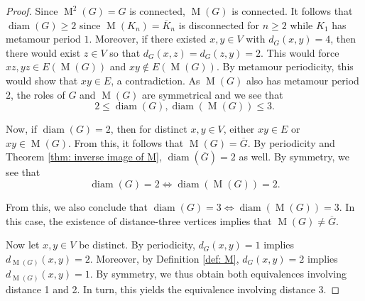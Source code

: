 \documentclass[12pt]{amsart}
\theoremstyle{definition}
\theoremstyle{remark}
\numberwithin{equation}{section}
\numberwithin{figure}{section}
\newcommand{\M}{\operatorname{M}}
\newcommand{\diam}{\operatorname{diam}}
\begin{document}
\begin{proof}
    Since $\M^2(G) = G$ is connected, $\M(G)$ is connected. It follows that $\diam(G) \geq 2$ since $\M(K_n)=\overline{K}_n$ is disconnected for $n\ge 2$ while $K_1$ has metamour period $1$.
    Moreover, if there existed $x,y\in V$ with $d_G(x,y)=4$, then there would exist $z\in V$ so that $d_G(x,z)=d_G(z,y)=2$. This would force $xz,yz\in E(\M(G))$ and $xy\not\in E(\M(G))$. By metamour periodicity, this would show that $xy\in E$, a contradiction. As $\M(G)$ also has metamour period $2$, the roles of $G$ and $\M(G)$ are symmetrical and we see that
    \[ 2 \leq \diam(G), \diam(\M(G)) \leq 3.\]

    Now, if $\diam(G)=2$, then for distinct $x,y\in V$, either $xy\in E$ or $xy \in \M(G)$. From this, it follows that $\M(G) = \overline{G}$. By periodicity and Theorem \ref{thm: inverse image of M}, $\diam(\overline{G})=2$ as well. By symmetry, we see that 
    \[ \diam(G) =2 \iff \diam(\M(G)) = 2. \]

    From this, we also conclude that $\diam(G) =3 \iff \diam(\M(G)) = 3$. In this case, the existence of distance-three vertices implies that $\M(G)\neq\overline{G}$.

    Now let $x,y\in V$ be distinct. By periodicity, $d_G(x,y)=1$ implies $d_{\M(G)}(x,y) = 2$.
    Moreover, by Definition \ref{def: M}, $d_G(x,y)=2$ implies $d_{\M(G)}(x,y) = 1$. 
    By symmetry, we thus obtain both equivalences involving distance 1 and 2.
    In turn, this yields the equivalence involving distance $3$. 
\end{proof} 
\end{document}
